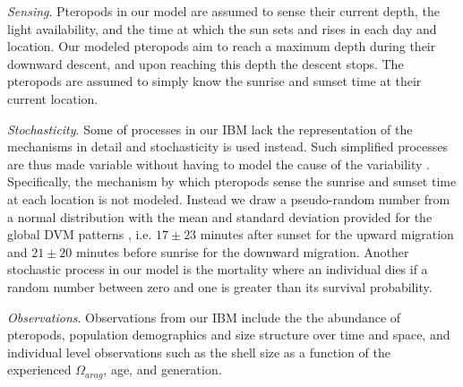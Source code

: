 \textit{Sensing}. Pteropods in our model are assumed to sense their current depth, the light availability, and the time at which the sun sets and rises in each day and location. Our modeled pteropods aim to reach a maximum depth during their downward descent, and upon reaching this depth the descent stops. The pteropods are assumed to simply know the sunrise and sunset time at their current location.



\textit{Stochasticity}. Some of processes in our IBM lack the representation of the mechanisms in detail and stochasticity is used instead. Such simplified processes are thus made variable without having to model the cause of the variability  \citep{Grimm2010UpdateODD,Grimm2020SecondUpdateODD}. Specifically, the mechanism by which pteropods sense the sunrise and sunset time at each location is not modeled. Instead we draw a pseudo-random number from a normal distribution with the mean and standard deviation provided for the global DVM patterns \citep{Bianchi2015GlobalDVM}, i.e. $17 \pm 23$ minutes after sunset for the upward migration and  $21 \pm 20$ minutes before sunrise for the downward migration. Another stochastic process in our model is the mortality where an individual dies if a random number between zero and one is greater than its survival probability.


\textit{Observations}. Observations from our IBM include the the abundance of pteropods, population demographics and size structure over time and space, and individual level observations such as the shell size as a function of the experienced $\Omega_{arag}$, age, and generation.





